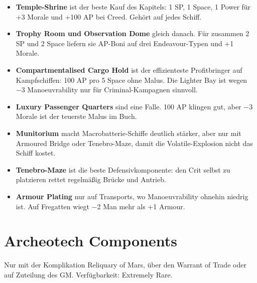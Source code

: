 \documentclass[9pt,a4paper]{extarticle}
\newcommand{\nm}[1]{\textbf{#1}}
\newcommand{\src}[1]{\hfill\raisebox{3pt}{\monofont\footnotesize\color{ink3}#1}}
\newenvironment{urteil}{\begin{tcolorbox}[colback=brasssoft,colframe=brass,boxrule=0pt,leftrule=2pt,arc=0pt,left=6pt,right=6pt,top=4pt,bottom=4pt,before skip=6pt,after skip=10pt,title={\monofont\scriptsize\bfseries\color{brass}URTEIL},coltitle=brass,colbacktitle=brasssoft,toptitle=2pt,bottomtitle=0pt,attach title to upper=\par]\begin{itemize}[leftmargin=10pt,itemsep=1pt,parsep=0pt,topsep=2pt]}{\end{itemize}\end{tcolorbox}}
\begin{document}
\begin{urteil}
\item \nm{Temple-Shrine} ist der beste Kauf des Kapitels: 1 SP, 1 Space, 1 Power für +3 Morale und +100 AP bei Creed. Gehört auf jedes Schiff.
\item \nm{Trophy Room und Observation Dome} gleich danach. Für zusammen 2 SP und 2 Space liefern sie AP-Boni auf drei Endeavour-Typen und +1 Morale.
\item \nm{Compartmentalised Cargo Hold} ist der effizienteste Profitbringer auf Kampfschiffen: 100 AP pro 5 Space ohne Malus. Die Lighter Bay ist wegen −3 Manoeuvrability nur für Criminal-Kampagnen sinnvoll.
\item \nm{Luxury Passenger Quarters} sind eine Falle. 100 AP klingen gut, aber −3 Morale ist der teuerste Malus im Buch.
\item \nm{Munitorium} macht Macrobatterie-Schiffe deutlich stärker, aber nur mit Armoured Bridge oder Tenebro-Maze, damit die Volatile-Explosion nicht das Schiff kostet.
\item \nm{Tenebro-Maze} ist die beste Defensivkomponente: den Crit selbst zu platzieren rettet regelmäßig Brücke und Antrieb.
\item \nm{Armour Plating} nur auf Transports, wo Manoeuvrability ohnehin niedrig ist. Auf Fregatten wiegt −2 Man mehr als +1 Armour.
\end{urteil}

\section{Archeotech Components \src{S. 206--207, Tabelle 8-6}}
Nur mit der Komplikation Reliquary of Mars, über den Warrant of Trade oder auf Zuteilung des GM. Verfügbarkeit: Extremely Rare.
\end{document}
